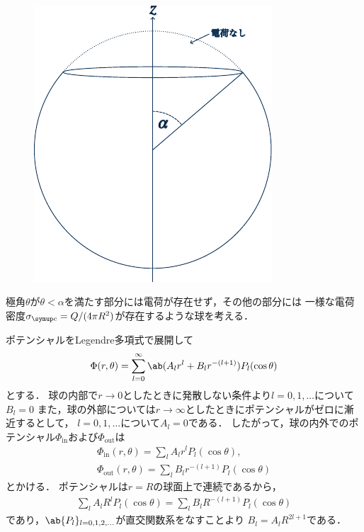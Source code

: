   \hrulefill\\
  \begin{figure}
    \centering%
    \includegraphics[width=\linewidth]{fig/Jackson3-2.pdf}%
  \end{figure}%
  極角$\theta$が$\theta < \alpha$を満たす部分には電荷が存在せず，その他の部分には
  一様な電荷密度$\sigma_{\mr{c}} = Q /(4\pi R^2)$が存在するような球を考える．

  ポテンシャルをLegendre多項式で展開して
  \begin{gather}%
    \Phi(r,\theta) = \sum_{l=0}^\infty \ab(A_l r^l + B_l r^{-(l+1)}) P_l(\cos\theta)
  \end{gather}%
  とする．
  球の内部で$r\to 0$としたときに発散しない条件より$l = 0, 1, \ldots$について$B_l = 0$
  また，球の外部については$r \to \infty$としたときにポテンシャルがゼロに漸近するとして，
  $l = 0, 1, \ldots$について$A_l = 0$である．
  したがって，球の内外でのポテンシャル$\Phi_{\text{in}}$および$\Phi_{\text{out}}$は
  \begin{gather}%
    \Phi_{\text{in}}(r,\theta) = \sum_{l} A_l r^l P_l(\cos\theta),\\
    \Phi_{\text{out}}(r,\theta) = \sum_{l} B_l r^{-(l+1)} P_l(\cos\theta)
  \end{gather}%
  とかける．
  ポテンシャルは$r= R$の球面上で連続であるから，
  \begin{gather}%
    \sum_l A_l R^l P_l(\cos\theta) = \sum_l B_l R^{-(l+1)}P_l(\cos\theta)
  \end{gather}%
  であり，$\ab\{P_l\}_{l=0,1,2,\ldots}$が直交関数系をなすことより
  $B_l = A_l R^{2l+1}$である．

